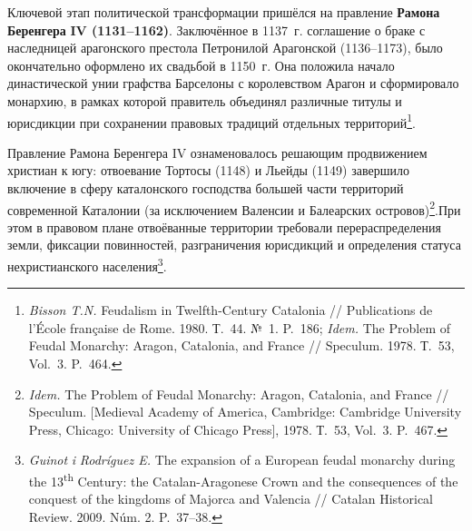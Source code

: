 Ключевой этап политической трансформации пришёлся на правление \textbf{Рамона }\textbf{Беренгера}\textbf{ IV (1131--1162)}. Заключённое в 1137~г. соглашение о браке с наследницей арагонского престола Петронилой Арагонской (1136--1173), было окончательно оформлено их свадьбой в 1150~г. Она положила начало династической унии графства Барселоны с королевством Арагон и сформировало монархию, в рамках которой правитель объединял различные титулы и юрисдикции при сохранении правовых традиций отдельных территорий\footnote{\emph{Bisson T.N.} Feudalism in Twelfth-Century Catalonia // Publications de l’École française de Rome. 1980. Т.~44. №~1. P.~186; \emph{Idem.} The Problem of Feudal Monarchy: Aragon, Catalonia, and France // Speculum. 1978. Т.~53, Vol.~3. P.~464.}.

Правление Рамона Беренгера IV ознаменовалось решающим продвижением христиан к югу: отвоевание Тортосы (1148) и Льейды (1149) завершило включение в сферу каталонского господства большей части территорий современной Каталонии (за исключением Валенсии и Балеарских островов)\footnote{\emph{Idem.} The Problem of Feudal Monarchy: Aragon, Catalonia, and France // Speculum. [Medieval Academy of America, Cambridge: Cambridge University Press, Chicago: University of Chicago Press], 1978. Т.~53, Vol.~3. P.~467.}.При этом в правовом плане отвоёванные территории требовали перераспределения земли, фиксации повинностей, разграничения юрисдикций и определения статуса нехристианского населения\footnote{\emph{Guinot }\emph{i}\emph{ Rodríguez E.} The expansion of a European feudal monarchy during the 13\textsuperscript{th} Century: the Catalan-Aragonese Crown and the consequences of the conquest of the kingdoms of Majorca and Valencia // Catalan Historical Review. 2009. Núm. 2. P.~37--38.}.

